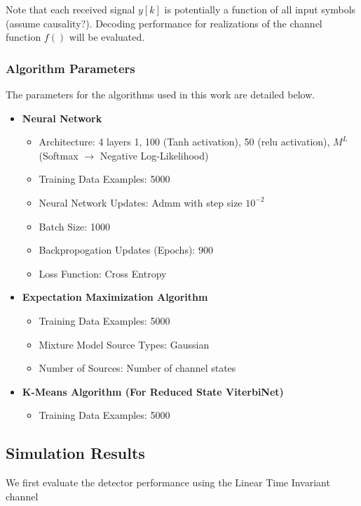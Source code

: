 \documentclass[12pt,a4paper]{article}
\begin{document}
Note that each received signal $y[k] $ is potentially a function of all input symbols (assume causality?). Decoding performance for realizations of the channel function $f()$ will be evaluated. 

\subsubsection{Algorithm Parameters}
The parameters for the algorithms used in this work are detailed below.
\begin{itemize}
\item \textbf{Neural Network}
\begin{itemize}
\item Architecture: 4 layers {1, 100 (Tanh activation), 50 (relu activation), $M^L$ (Softmax $\rightarrow$ Negative Log-Likelihood)}
\item Training Data Examples: 5000
\item Neural Network Updates: Admm \cite{kingma2014adam} with step size $10^{-2}$ 
\item Batch Size: 1000 
\item Backpropogation Updates (Epochs): 900
\item Loss Function: Cross Entropy
\end{itemize}
\item \textbf{Expectation Maximization Algorithm}
\begin{itemize}
\item Training Data Examples: 5000
\item Mixture Model Source Types: Gaussian
\item Number of Sources: Number of channel states
\end{itemize}
\item \textbf{K-Means Algorithm (For Reduced State ViterbiNet)}
\begin{itemize}
\item Training Data Examples: 5000
\end{itemize}
\end{itemize}


\subsection{Simulation Results}
We first evaluate the detector performance using the Linear Time Invariant channel
\end{document}
